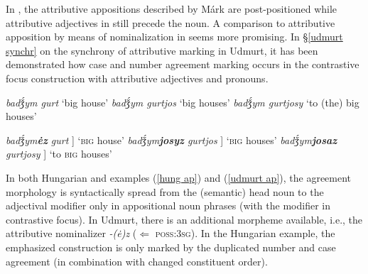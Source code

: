 {\largerpage[2]
In , the attributive appositions described by Márk are post\hyp{}positioned while attributive adjectives in  still precede the noun. A comparison to attributive apposition by means of nominalization in  seems more promising. In \S\ref{udmurt synchr} on the synchrony of attributive marking in Udmurt, it has been demonstrated how case and number agreement marking occurs in the contrastive focus construction with attributive adjectives and pronouns.
\begin{exe}
\label{udmurt ap}
\begin{xlist}
\begin{xlist}
\ex	\textit{badǯ́ym gurt} 				{ ‘big house’}
\ex	\textit{badǯ́ym gurtjos} 			{ ‘big houses’}
\ex	\textit{badǯ́ym gurtjosy} 			{ ‘to (the) big houses’}
\end{xlist}
\begin{xlist}
\ex	\textit{badǯ́ym\textbf{ėz} gurt} 		{\upshape [[A\textsubscript{contr}] [N]] ‘\textsc{big} house’}
\ex	\textit{badǯ́ym\textbf{josyz} gurtjos} 	{\upshape [[A\textsubscript{contr:pl}] [N\textsubscript{pl}]] ‘\textsc{big} houses’}
\ex	\textit{badǯ́ym\textbf{josaz} gurtjosy} 	{\upshape [[A\textsubscript{contr:pl:ill}] [N\textsubscript{pl:ill}]] ‘to \textsc{big} houses’}
\end{xlist}
\end{xlist}
\end{exe}

In both Hungarian and  examples (\ref{hung ap}) and (\ref{udmurt ap}), the agreement morphology is syntactically spread from the (semantic) head noun to the adjectival modifier only in appositional noun phrases (with the modifier in contrastive focus). In Udmurt, there is an additional morpheme available, i.e., the attributive nominalizer \textit{-(ė)z} ($\Leftarrow$ \textsc{poss:3sg}). In the Hungarian example, the emphasized construction is only marked by the duplicated number and case agreement (in combination with changed constituent order).

}
